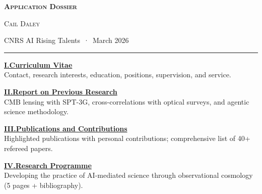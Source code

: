 \documentclass[11pt, a4paper]{article}
\newcommand{\headingfont}{\sffamily}
\begin{document}
\thispagestyle{plain}
\begin{center}
  \vspace*{2cm}
  {\LARGE\headingfont\bfseries\scshape Application Dossier\par}
  \vspace{0.5em}
  {\large\scshape Cail Daley\par}
  \vspace{0.2em}
  {\normalsize CNRS AI Rising Talents \,·\, March 2026\par}
\end{center}
\vspace{1.8cm}
\noindent\rule{\textwidth}{0.4pt}
\vspace{1em}

\noindent{\large\headingfont\bfseries\scshape Contents\par}
\vspace{0.8em}

\noindent\hyperref[sec:cv]{\textbf{I.\enspace Curriculum Vitae}}\dotfill\,\pageref{sec:cv}\\[0.15em]
{\small Contact, research interests, education, positions, supervision, and service.}

\vspace{0.6em}

\noindent\hyperref[sec:report]{\textbf{II.\enspace Report on Previous Research}}\dotfill\,\pageref{sec:report}\\[0.15em]
{\small CMB lensing with SPT-3G, cross-correlations with optical surveys, and agentic science methodology.}

\vspace{0.6em}

\noindent\hyperref[sec:publications]{\textbf{III.\enspace Publications and Contributions}}\dotfill\,\pageref{sec:publications}\\[0.15em]
{\small Highlighted publications with personal contributions; comprehensive list of 40+ refereed papers.}

\vspace{0.6em}

\noindent\hyperref[sec:programme]{\textbf{IV.\enspace Research Programme}}\dotfill\,\pageref{sec:programme}\\[0.15em]
{\small Developing the practice of AI-mediated science through observational cosmology (5 pages + bibliography).}
\end{document}

